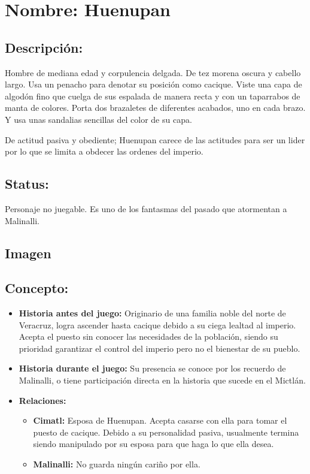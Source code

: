 \section{Nombre: Huenupan}  \label{per:huenupan}
\subsection{Descripción:} 
Hombre de mediana edad y corpulencia delgada. De tez morena oscura y cabello largo. Usa un penacho para denotar su posición como cacique. Viste una capa de algodón fino que cuelga de sus espalada de manera recta y con un taparrabos de manta de colores. Porta dos brazaletes de diferentes acabados, uno en cada brazo. Y usa unas sandalias sencillas del color de su capa.     
\\
\par
De actitud pasiva y obediente; Huenupan carece de las actitudes para ser un lider por lo que se limita a obdecer las ordenes del imperio. 
\subsection{Status:}
Personaje no juegable.
Es uno de los fantasmas del pasado que atormentan a Malinalli.
\subsection{Imagen}
\subsection{Concepto:}
\begin{itemize}
	\item \textbf{Historia antes del juego:}
	Originario de una familia noble del  norte de Veracruz, logra ascender hasta cacique debido a su ciega lealtad al imperio. Acepta el puesto sin conocer las necesidades de la población, siendo su prioridad garantizar el control del imperio pero no el bienestar de su pueblo.  
	\item \textbf{Historia durante el juego:}
	Su presencia se conoce por los recuerdo de Malinalli, o tiene participación directa en la historia que sucede en el Mictlán.
	\item \textbf{Relaciones:}
	\begin{itemize}
		\item \textbf{Cimatl:} Esposa de Huenupan. Acepta casarse con ella para tomar el puesto de cacique. Debido a su personalidad pasiva, usualmente termina siendo manipulado por su esposa para que haga lo que ella desea. 
		\item \textbf{Malinalli:} No guarda ningún cariño por ella. 
	\end{itemize}                     
\end{itemize}

